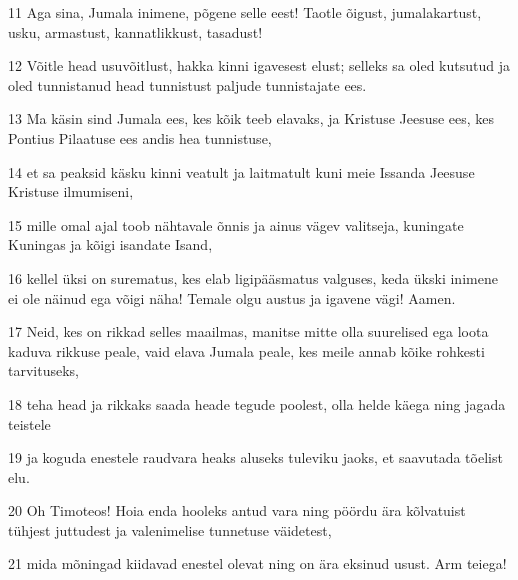 \par 11 Aga sina, Jumala inimene, põgene selle eest! Taotle õigust, jumalakartust, usku, armastust, kannatlikkust, tasadust!
\par 12 Võitle head usuvõitlust, hakka kinni igavesest elust; selleks sa oled kutsutud ja oled tunnistanud head tunnistust paljude tunnistajate ees.
\par 13 Ma käsin sind Jumala ees, kes kõik teeb elavaks, ja Kristuse Jeesuse ees, kes Pontius Pilaatuse ees andis hea tunnistuse,
\par 14 et sa peaksid käsku kinni veatult ja laitmatult kuni meie Issanda Jeesuse Kristuse ilmumiseni,
\par 15 mille omal ajal toob nähtavale õnnis ja ainus vägev valitseja, kuningate Kuningas ja kõigi isandate Isand,
\par 16 kellel üksi on surematus, kes elab ligipääsmatus valguses, keda ükski inimene ei ole näinud ega võigi näha! Temale olgu austus ja igavene vägi! Aamen.
\par 17 Neid, kes on rikkad selles maailmas, manitse mitte olla suurelised ega loota kaduva rikkuse peale, vaid elava Jumala peale, kes meile annab kõike rohkesti tarvituseks,
\par 18 teha head ja rikkaks saada heade tegude poolest, olla helde käega ning jagada teistele
\par 19 ja koguda enestele raudvara heaks aluseks tuleviku jaoks, et saavutada tõelist elu.
\par 20 Oh Timoteos! Hoia enda hooleks antud vara ning pöördu ära kõlvatuist tühjest juttudest ja valenimelise tunnetuse väidetest,
\par 21 mida mõningad kiidavad enestel olevat ning on ära eksinud usust. Arm teiega!




